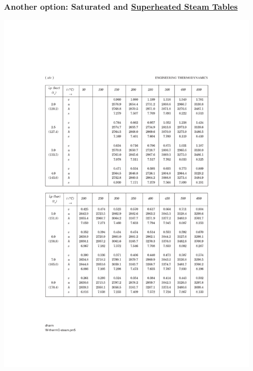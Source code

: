 \documentclass[10pt,compress,handout,ignorenonframetext]{beamer}
\begin{document}
\begin{frame}
  \frametitle{Another option: Saturated and \underline{Superheated Steam Tables}}
     \vspace{-2.4cm}
     \begin{center}
       \includegraphics[width=10.cm,height=12.cm,clip]{./Pics/Sample_SteamTablePg2}
     \end{center}
\end{frame}



\end{document}
